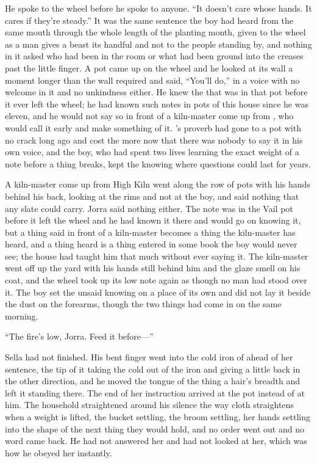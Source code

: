 He spoke to the wheel before he spoke to anyone. “It doesn't care whose hands. It cares if they're steady.” It was the same sentence the boy had heard from the same mouth through the whole length of the planting month, given to the wheel as a man gives a beast its handful and not to the people standing by, and nothing in it asked who had been in the room or what had been ground into the creases past the little finger. A pot came up on the wheel and he looked at its wall a moment longer than the wall required and said, “You'll do,” in a voice with no welcome in it and no unkindness either. He knew the  that was in that pot before it ever left the wheel; he had known such notes in pots of this house since he was eleven, and he would not say so in front of a kiln-master come up from , who would call it early and make something of it. 's proverb had gone to a pot with no crack long ago and cost the more now that there was nobody to say it in his own voice, and the boy, who had spent two lives learning the exact weight of a note before a thing breaks, kept the knowing where questions could last for years.

A kiln-master come up from High Kiln went along the row of pots with his hands behind his back, looking at the rims and not at the boy, and said nothing that any slate could carry. Jorra said nothing either. The note was in the Vail pot before it left the wheel and he had known it there and would go on knowing it, but a thing said in front of a kiln-master becomes a thing the kiln-master has heard, and a thing heard is a thing entered in some book the boy would never see; the house had taught him that much without ever saying it. The kiln-master went off up the yard with his hands still behind him and the glaze smell on his coat, and the wheel took up its low note again as though no man had stood over it. The boy set the unsaid knowing on a place of its own and did not lay it beside the dust on the forearms, though the two things had come in on the same morning.

\scenebreak

“The fire's low, Jorra. Feed it before—”

Sella had not finished. His bent finger went into the cold iron of  ahead of her sentence, the tip of it taking the cold out of the iron and giving a little back in the other direction, and he moved the tongue of the thing a hair's breadth and left it standing there. The end of her instruction arrived at the pot instead of at him. The household straightened around his silence the way cloth straightens when a weight is lifted, the bucket settling, the broom settling, her hands settling into the shape of the next thing they would hold, and no order went out and no word came back. He had not answered her and had not looked at her, which was how he obeyed her instantly.

